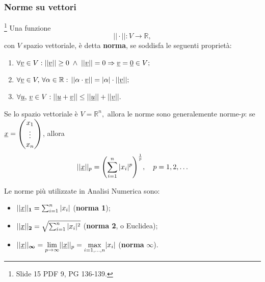 \subsubsection{Norme su vettori}\label{sssec:normVett}
\begin{definition}\footnote{Slide 15 PDF 9, PG 136-139.}
    Una funzione
    \begin{equation*}
        ||\cdot||: V\rightarrow\mathbb{R},
    \end{equation*}
    con $V$ spazio vettoriale, è detta \textbf{norma}, se soddisfa le seguenti proprietà:
    \begin{enumerate}
        \item $\forall\uline v\in V:||\uline v||\geq 0 \;\wedge\;||\uline v||=0\Rightarrow\uline v=\uline 0\in V; $
        \item $\forall\uline v\in V,\, \forall\alpha\in\mathbb{R}:\, ||\alpha\cdot\uline v||=|\alpha|\cdot||\uline v||;$
        \item $\forall\uline u,\,\uline v\in V: ||\uline u+\uline v||\leq ||\uline u||+||\uline v||.$
    \end{enumerate}
\end{definition}

\noindent Se lo spazio vettoriale è $V=\mathbb{R}^n,$ allora le norme sono generalemente norme-$p$: se $\uline x=\begin{pmatrix}
    x_1\\
    \vdots\\
    x_n
\end{pmatrix}$, allora \begin{equation*}
    ||\uline x||_p=\Biggl({\sum_{i=1}^n|x_i|^p}\Biggl)^{\frac{1}{p}},\quad p=1,2,\hdots
\end{equation*}

\noindent Le norme più utilizzate in Analisi Numerica sono:
\begin{itemize}
    \item $||\uline x||_{\boldsymbol 1}=\sum_{i=1}^n|x_i|$ (\textbf{norma 1});
    \item $||\uline x||_{\boldsymbol 2}=\sqrt{\sum_{i=1}^n|x_i|^2}$ (\textbf{norma 2}, o Euclidea);
    \item $||\uline x||_{\boldsymbol\infty}=\underset{{p\to\infty}}{\lim}||\uline x||_p=\underset{i=1,\hdots, n}{\max}|x_i|$ (\textbf{norma }$\boldsymbol\infty$).
\end{itemize}

